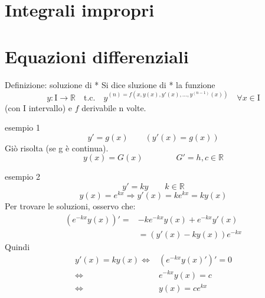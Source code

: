 \documentclass[x11names]{article}
\begin{document}
	\newpage
	\section{Integrali impropri}
	
	
	\newpage
	\section{Equazioni differenziali}
	
		\begin{center}
		\colorbox{myblue}{\begin{minipage}{5.75in}
				\begin{blues}{Definizione: soluzione di *}
					Si dice sluzione di * la funzione
					\[
					y: \text{I} \to \mathbb{R} \quad \text{t.c.} \quad y^{(n) = f(x,y(x),y'(x),\dots,y^(n-1)(x))} \quad \forall x \in \text{I}
					\]
					(con I intervallo) e $f$ derivabile n volte.
				\end{blues}
		\end{minipage}}       
	\end{center}
	
	\begin{es}{esempio 1}
		\[
		y' = g(x) \qquad \left(y'(x) = g(x)\right)
		\]
		Giò risolta (se g è continua).
		\[
		y(x) = G(x) \qquad \qquad G' = h, c \in \mathbb{R}
		\]
	\end{es}
	
	\begin{es}{esempio 2}
		\[
		y' = ky \qquad k \in \mathbb{R}
		\]
		\[
		y(x) = e^{kx} \Longrightarrow y'(x) = ke^{kx} = ky(x)
		\]
		Per trovare le soluzioni, osservo che:
		\begin{align*}
			\left(e^{-kx}y(x)\right)' =& - ke^{-kx}y(x) + e^{-kx}y'(x) \\
			&= \left(y'(x) - ky(x)\right)e^{-kx}
		\end{align*}
		Quindi
		\begin{align*}
			y'(x) = ky(x) \Longleftrightarrow & \left(e^{-kx}y(x)'\right)' = 0 \\
			\Longleftrightarrow & e^{-kx}y(x) = c \\
			\Longleftrightarrow & y(x) = ce^{kx}
		\end{align*}
	\end{es}
	
\end{document}

